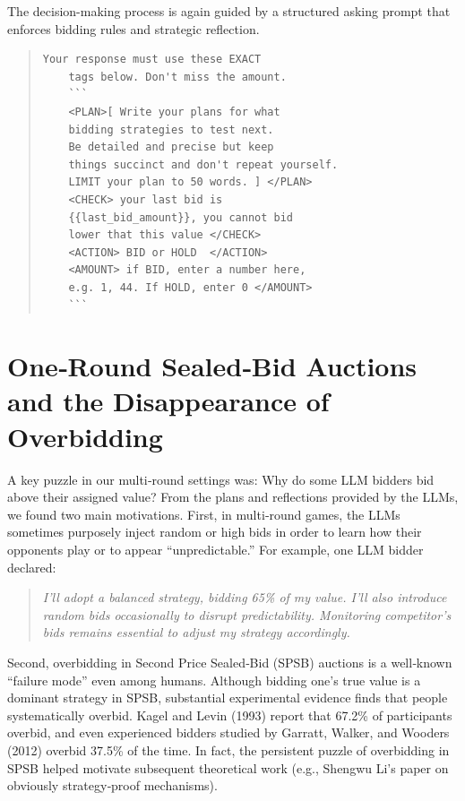 \documentclass{article} %
\begin{document}
The decision-making process is again guided by a structured asking prompt that enforces bidding rules and strategic reflection. 
\begin{quote}
\begin{lstlisting}[basicstyle=\ttfamily]
    Your response must use these EXACT 
    tags below. Don't miss the amount.
    ```
    <PLAN>[ Write your plans for what
    bidding strategies to test next.
    Be detailed and precise but keep 
    things succinct and don't repeat yourself.
    LIMIT your plan to 50 words. ] </PLAN>
    <CHECK> your last bid is 
    {{last_bid_amount}}, you cannot bid
    lower that this value </CHECK>
    <ACTION> BID or HOLD  </ACTION>
    <AMOUNT> if BID, enter a number here,
    e.g. 1, 44. If HOLD, enter 0 </AMOUNT>
    ```
\end{lstlisting}
\end{quote}

\section{One‐Round Sealed‐Bid Auctions and the Disappearance of Overbidding}

A key puzzle in our multi‐round settings was: Why do some LLM bidders bid above their assigned value? 
From the plans and reflections provided by the LLMs, we found two main motivations. 
First, in multi‐round games, the LLMs sometimes purposely inject random or high bids in order to learn how their opponents play or to appear ``unpredictable.'' For example, one LLM bidder declared:
\begin{quote}
    \textit{I'll adopt a balanced strategy, bidding 65\% of my value. I'll also introduce random bids occasionally to disrupt predictability. Monitoring competitor's bids remains essential to adjust my strategy accordingly.}
\end{quote}

Second, overbidding in Second Price Sealed‐Bid (SPSB) auctions is a well‐known ``failure mode'' even among humans. 
Although bidding one's true value is a dominant strategy in SPSB, substantial experimental evidence finds that people systematically overbid. Kagel and Levin (1993) report that 67.2\% of participants overbid, and even experienced bidders studied by Garratt, Walker, and Wooders (2012) overbid 37.5\% of the time. 
In fact, the persistent puzzle of overbidding in SPSB helped motivate subsequent theoretical work (e.g., Shengwu Li's paper on obviously strategy‐proof mechanisms).
\end{document}
